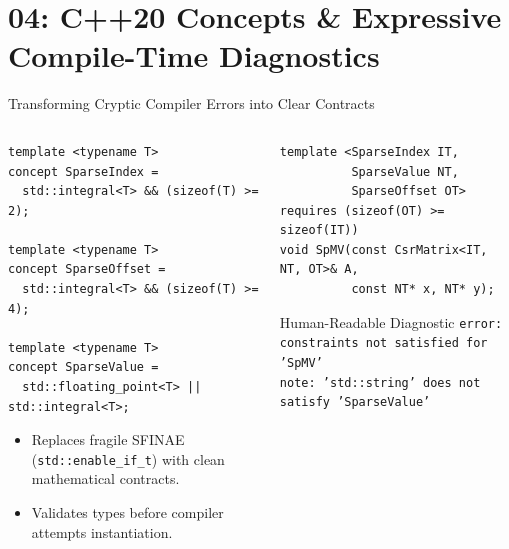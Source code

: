 \documentclass[aspectratio=169,10pt]{beamer}
\newcommand{\sectionfoot}[1]{\gdef\insertsectionhead{#1}}
\newcommand{\subhead}[1]{%
  \medskip{\large\bfseries\textcolor{Accent}{#1}\par}%
  \vspace{-0.18cm}{\color{Accent}\rule{0.88\linewidth}{1.2pt}\par}\smallskip}
\begin{document}
\section{04: C++20 Concepts \& Expressive Compile-Time Diagnostics}
\sectionfoot{04: C++20 Concepts}

\begin{frame}[fragile]{Transforming Cryptic Compiler Errors into Clear Contracts}
  \begin{columns}[T,onlytextwidth]
    \begin{column}{0.48\textwidth}
      \subhead{C++20 Concepts Definition}
      \begin{lstlisting}[style=lecturecode]
template <typename T>
concept SparseIndex =
  std::integral<T> && (sizeof(T) >= 2);

template <typename T>
concept SparseOffset =
  std::integral<T> && (sizeof(T) >= 4);

template <typename T>
concept SparseValue =
  std::floating_point<T> || std::integral<T>;
      \end{lstlisting}
      \vspace{-0.2cm}
      \begin{itemize}\setlength{\itemsep}{0.3em}
        \item Replaces fragile SFINAE (\texttt{std::enable\_if\_t}) with clean mathematical contracts.
        \item Validates types before compiler attempts instantiation.
      \end{itemize}
    \end{column}
    \begin{column}{0.48\textwidth}
      \subhead{Static Assertions \& Constrained Functions}
      \begin{lstlisting}[style=lecturecode]
template <SparseIndex IT,
          SparseValue NT,
          SparseOffset OT>
requires (sizeof(OT) >= sizeof(IT))
void SpMV(const CsrMatrix<IT, NT, OT>& A,
          const NT* x, NT* y);
      \end{lstlisting}
      \begin{exampleblock}{Human-Readable Diagnostic}
        \fontsize{6.2}{7.2}\selectfont\texttt{error: constraints not satisfied for 'SpMV'\\
        note: 'std::string' does not satisfy 'SparseValue'}
      \end{exampleblock}
    \end{column}
  \end{columns}
\end{frame}
\end{document}
